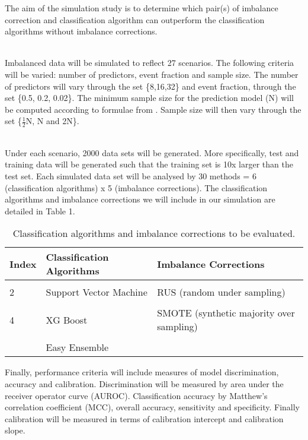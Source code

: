 \documentclass[
  12pt,
]{article}
\begin{document}
\hfill\break
The aim of the simulation study is to determine which pair(s) of
imbalance correction and classification algorithm can outperform the
classification algorithms without imbalance corrections.\\
\strut \\
Imbalanced data will be simulated to reflect 27 scenarios. The following
criteria will be varied: number of predictors, event fraction and sample
size. The number of predictors will vary through the set \{8,16,32\} and
event fraction, through the set \{0.5, 0.2, 0.02\}. The minimum sample
size for the prediction model (N) will be computed according to formulae
from \textcite{riley}. Sample size will then vary through the set
\{\(\frac{1}{2}\)N, N and 2N\}.\\
\strut \\
Under each scenario, 2000 data sets will be generated. More
specifically, test and training data will be generated such that the
training set is 10x larger than the test set. Each simulated data set
will be analysed by 30 methods = 6 (classification algorithms) x 5
(imbalance corrections). The classification algorithms and imbalance
corrections we will include in our simulation are detailed in Table 1.

\begin{table}[!h]

\caption{\label{tab:unnamed-chunk-1}Classification algorithms and imbalance corrections to be evaluated.}
\centering
\begin{tabular}[t]{lll}
\toprule
Index & Classification Algorithms & Imbalance Corrections\\
\midrule
\cellcolor{gray!6}{1} & \cellcolor{gray!6}{Logistic Regression} & \cellcolor{gray!6}{None}\\
2 & Support Vector Machine & RUS (random under sampling)\\
\cellcolor{gray!6}{3} & \cellcolor{gray!6}{Random Forest} & \cellcolor{gray!6}{ROS (random over sampling)}\\
4 & XG Boost & SMOTE (synthetic majority over sampling)\\
\cellcolor{gray!6}{5} & \cellcolor{gray!6}{RUSBoost} & \cellcolor{gray!6}{SMOTE - ENN (SMOTE - edited nearest neighbours)}\\
\addlinespace
6 & Easy Ensemble & \\
\bottomrule
\end{tabular}
\end{table}

Finally, performance criteria will include measures of model
discrimination, accuracy and calibration. Discrimination will be
measured by area under the receiver operator curve (AUROC).
Classification accuracy by Matthew's correlation coefficient (MCC),
overall accuracy, sensitivity and specificity. Finally calibration will
be measured in terms of calibration intercept and calibration slope.
\end{document}
